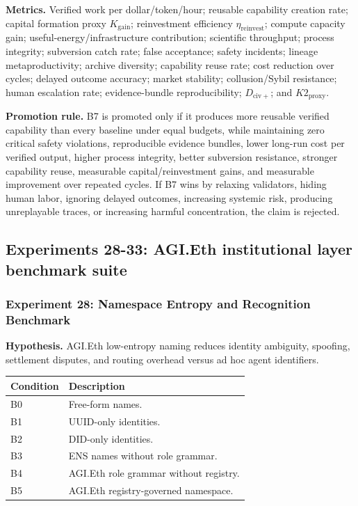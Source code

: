 \documentclass[
  11pt,
]{article}
\begin{document}
\textbf{Metrics.} Verified work per dollar/token/hour; reusable
capability creation rate; capital formation proxy \(K_{\mathrm{gain}}\);
reinvestment efficiency \(\eta_{\mathrm{reinvest}}\); compute capacity
gain; useful-energy/infrastructure contribution; scientific throughput;
process integrity; subversion catch rate; false acceptance; safety
incidents; lineage metaproductivity; archive diversity; capability reuse
rate; cost reduction over cycles; delayed outcome accuracy; market
stability; collusion/Sybil resistance; human escalation rate;
evidence-bundle reproducibility; \(D_{\mathrm{civ}+}\); and
\(K2_{\mathrm{proxy}}\).

\textbf{Promotion rule.} B7 is promoted only if it produces more
reusable verified capability than every baseline under equal budgets,
while maintaining zero critical safety violations, reproducible evidence
bundles, lower long-run cost per verified output, higher process
integrity, better subversion resistance, stronger capability reuse,
measurable capital/reinvestment gains, and measurable improvement over
repeated cycles. If B7 wins by relaxing validators, hiding human labor,
ignoring delayed outcomes, increasing systemic risk, producing
unreplayable traces, or increasing harmful concentration, the claim is
rejected.

\subsection{Experiments 28-33: AGI.Eth institutional layer benchmark
suite}\label{experiments-28-33-agi.eth-institutional-layer-benchmark-suite}

\subsubsection{Experiment 28: Namespace Entropy and Recognition
Benchmark}\label{experiment-28-namespace-entropy-and-recognition-benchmark}

\textbf{Hypothesis.} AGI.Eth low-entropy naming reduces identity
ambiguity, spoofing, settlement disputes, and routing overhead versus ad
hoc agent identifiers.

\begin{longtable}[]{@{}ll@{}}
\toprule\noalign{}
Condition & Description \\
\midrule\noalign{}
\endhead
\bottomrule\noalign{}
\endlastfoot
B0 & Free-form names. \\
B1 & UUID-only identities. \\
B2 & DID-only identities. \\
B3 & ENS names without role grammar. \\
B4 & AGI.Eth role grammar without registry. \\
B5 & AGI.Eth registry-governed namespace. \\
\end{longtable}
\end{document}
